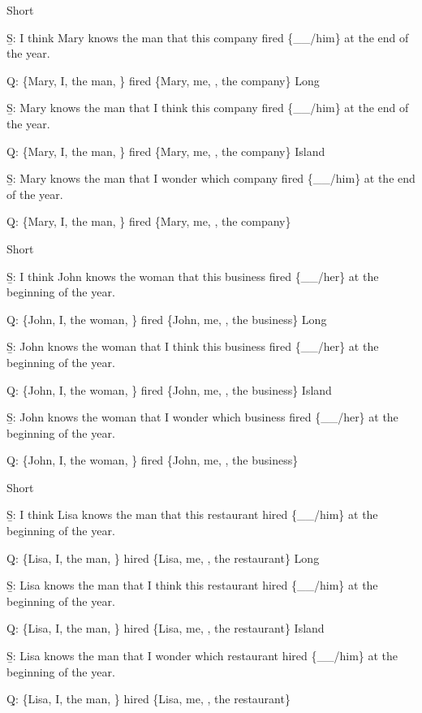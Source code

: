 \pex 
\a Short\par\nobreak
\beginsubsub 
\b{S:} I think Mary knows the man that this company fired \{\_\_/him\} at the end of the year.\par\nobreak
\b{Q:} \{Mary, I, the man, \} fired \{Mary, me, , the company\}
\endsubsub
\a Long\par\nobreak
\beginsubsub
\b{S:} Mary knows the man that I think this company fired \{\_\_/him\} at the end of the year.\par\nobreak
\b{Q:} \{Mary, I, the man, \} fired \{Mary, me, , the company\}
\endsubsub
\a Island\par\nobreak
\beginsubsub
\b{S:} Mary knows the man that I wonder which company fired \{\_\_/him\} at the end of the year.\par\nobreak
\b{Q:} \{Mary, I, the man, \} fired \{Mary, me, , the company\}
\endsubsub
\xe

\pex 
\a Short\par\nobreak
\beginsubsub 
\b{S:} I think John knows the woman that this business fired \{\_\_/her\} at the beginning of the year.\par\nobreak
\b{Q:} \{John, I, the woman, \} fired \{John, me, , the business\}
\endsubsub
\a Long\par\nobreak
\beginsubsub
\b{S:} John knows the woman that I think this business fired \{\_\_/her\} at the beginning of the year.\par\nobreak
\b{Q:} \{John, I, the woman, \} fired \{John, me, , the business\}
\endsubsub
\a Island\par\nobreak
\beginsubsub
\b{S:} John knows the woman that I wonder which business fired \{\_\_/her\} at the beginning of the year.\par\nobreak
\b{Q:} \{John, I, the woman, \} fired \{John, me, , the business\}
\endsubsub
\xe

\pex 
\a Short\par\nobreak
\beginsubsub 
\b{S:} I think Lisa knows the man that this restaurant hired \{\_\_/him\} at the beginning of the year.\par\nobreak
\b{Q:} \{Lisa, I, the man, \} hired \{Lisa, me, , the restaurant\}
\endsubsub
\a Long\par\nobreak
\beginsubsub
\b{S:} Lisa knows the man that I think this restaurant hired \{\_\_/him\} at the beginning of the year.\par\nobreak
\b{Q:} \{Lisa, I, the man, \} hired \{Lisa, me, , the restaurant\}
\endsubsub
\a Island\par\nobreak
\beginsubsub
\b{S:} Lisa knows the man that I wonder which restaurant hired \{\_\_/him\} at the beginning of the year.\par\nobreak
\b{Q:} \{Lisa, I, the man, \} hired \{Lisa, me, , the restaurant\}
\endsubsub
\xe

